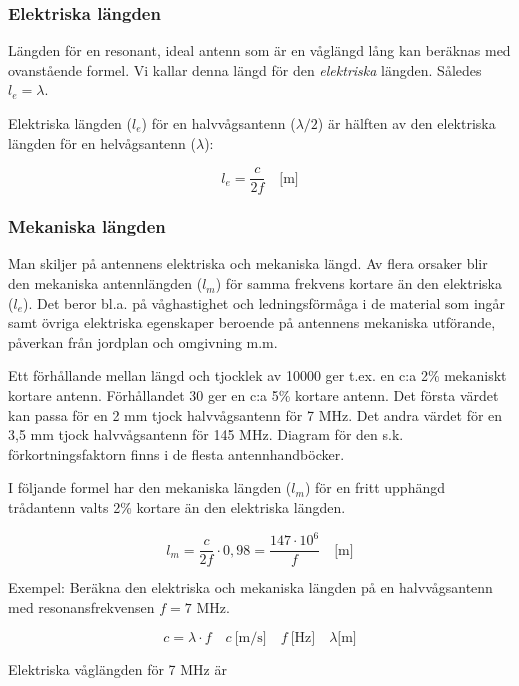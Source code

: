 \subsubsection{Elektriska längden}

Längden för en resonant, ideal antenn som är en våglängd lång kan
beräknas med ovanstående formel. Vi kallar denna längd för den
\emph{elektriska} längden. Således \(l_e = \lambda\).

Elektriska längden (\(l_e\)) för en halvvågsantenn (\(\lambda/2\))
är hälften av den elektriska längden för en helvågsantenn
(\(\lambda\)):

\[l_e = \frac{c}{2f} \quad \text{[m]}\]

\subsubsection{Mekaniska längden}

Man skiljer på antennens elektriska och mekaniska längd. Av flera
orsaker blir den mekaniska antennlängden (\(l_m\)) för samma
frekvens kortare än den elektriska (\(l_e\)). Det beror bl.a. på
våghastighet och ledningsförmåga i de material som ingår samt övriga
elektriska egenskaper beroende på antennens mekaniska utförande,
påverkan från jordplan och omgivning m.m.

Ett förhållande mellan längd och tjocklek av 10000 ger t.ex. en c:a
2\% mekaniskt kortare antenn. Förhållandet 30 ger en c:a 5\% kortare
antenn. Det första värdet kan passa för en 2 mm tjock halvvågsantenn
för 7 MHz. Det andra värdet för en 3,5 mm tjock halvvågsantenn för 145
MHz. Diagram för den s.k. förkortningsfaktorn finns i de flesta
antennhandböcker.

I följande formel har den mekaniska längden (\(l_m\)) för en fritt upphängd
trådantenn valts 2\% kortare än den elektriska längden.

\[l_m = \frac{c}{2f} \cdot 0,98 = \frac{147\cdot 10^6}{f} \quad \text{[m]}\]

Exempel: Beräkna den elektriska och mekaniska längden på en halvvågsantenn med
resonansfrekvensen \(f = 7\) MHz.

\[
c = \lambda \cdot f
\quad c\ \text{[m/s]} \quad f\ \text{[Hz]} \quad \lambda \text{[m]}
\]

Elektriska våglängden för 7 MHz är

